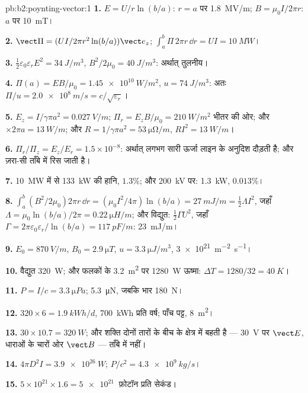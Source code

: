 \begin{solution}{pb:b2:poynting-vector:1}
\textbf{1.} $E = U/r\ln(b/a)$: $r = a$ पर \qty{1.8}{MV/m}; $B = \mu_0I/2\pi r$:
$a$ पर \qty{10}{mT}।

\textbf{2.} $\vect\Pi = (UI/2\pi r^2\ln(b/a))\vect e_z$; $\int_a^b\Pi\,2\pi r\,\dd r = UI =
\qty{10}{MW}$।

\textbf{3.} $\tfrac12\varepsilon_0\varepsilon_rE^2 = \qty{34}{J/m^3}$, $B^2/2\mu_0 = \qty{40}{J/m^3}$:
अर्थात् तुलनीय।

\textbf{4.} $\Pi(a) = EB/\mu_0 = \qty{1.45e10}{W/m^2}$, $u = \qty{74}{J/m^3}$: अतः $\Pi/u =
\qty{2.0e8}{m/s} = c/\sqrt{\varepsilon_r}$।

\textbf{5.} $E_z = I/\gamma\pi a^2 = \qty{0.027}{V/m}$; $\Pi_r = E_zB/\mu_0 = \qty{210}{W/m^2}$
भीतर की ओर; और $\times2\pi a = \qty{13}{W/m}$; और $R = 1/\gamma\pi a^2 = \qty{53}{\micro\ohm/m}$, $RI^2 =
\qty{13}{W/m}$।

\textbf{6.} $\Pi_r/\Pi_z = E_z/E_r = 1.5 \times 10^{-8}$: अर्थात् लगभग सारी ऊर्जा
लाइन के अनुदिश दौड़ती है; और ज़रा-सी ताँबे में रिस जाती है।

\textbf{7.} \qty{10}{MW} में से \qty{133}{kW} की हानि, $1.3\%$; और \qty{200}{kV} पर: \qty{1.3}{kW},
$0.013\%$।

\textbf{8.} $\int_a^b(B^2/2\mu_0)2\pi r\,\dd r = (\mu_0I^2/4\pi)\ln(b/a) = \qty{27}{mJ/m} =
\tfrac12\Lambda I^2$, जहाँ $\Lambda = \mu_0\ln(b/a)/2\pi = \qty{0.22}{\micro H/m}$; और विद्युत:
$\tfrac12\Gamma U^2$, जहाँ $\Gamma = 2\pi\varepsilon_0\varepsilon_r/\ln(b/a) = \qty{117}{pF/m}$: \qty{23}{mJ/m}।

\textbf{9.} $E_0 = \qty{870}{V/m}$, $B_0 = \qty{2.9}{\micro T}$, $u = \qty{3.3}{\micro J/m^3}$,
\qty{3e21}{m^{-2}.s^{-1}}।

\textbf{10.} वैद्युत \qty{320}{W}; और फलकों के \qty{3.2}{m^2} पर \qty{1280}{W}
ऊष्मा: $\Delta T = 1280/32 = \qty{40}{K}$।

\textbf{11.} $P = I/c = \qty{3.3}{\micro Pa}$; \qty{5.3}{\micro N}, जबकि भार
\qty{180}{N}।

\textbf{12.} $320 \times 6 = \qty{1.9}{kWh/d}$, \qty{700}{kWh} प्रति वर्ष; पाँच पट्ट,
\qty{8}{m^2}।

\textbf{13.} $30 \times 10.7 = \qty{320}{W}$; और शक्ति दोनों तारों के बीच के क्षेत्र
में बहती है --- \qty{30}{V} पर $\vect E$, धाराओं के चारों ओर $\vect B$ ---
ताँबे में नहीं।

\textbf{14.} $4\pi D^2I = \qty{3.9e26}{W}$; $P/c^2 = \qty{4.3e9}{kg/s}$।

\textbf{15.} $5 \times 10^{21} \times 1.6 = \qty{5e21}{}$ फ़ोटॉन प्रति सेकंड।


\end{solution}
